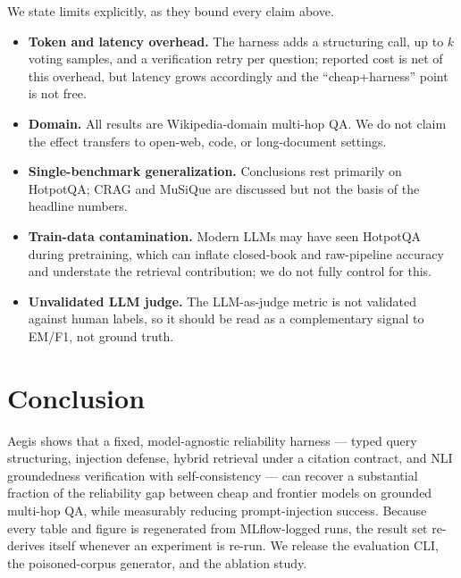 \documentclass[twocolumn,10pt]{article}
\begin{document}
We state limits explicitly, as they bound every claim above.
\begin{itemize}
  \item \textbf{Token and latency overhead.} The harness adds a structuring
  call, up to $k$ voting samples, and a verification retry per question;
  reported cost is net of this overhead, but latency grows accordingly and the
  ``cheap+harness'' point is not free.
  \item \textbf{Domain.} All results are Wikipedia-domain multi-hop QA. We do
  not claim the effect transfers to open-web, code, or long-document settings.
  \item \textbf{Single-benchmark generalization.} Conclusions rest primarily on
  HotpotQA; CRAG and MuSiQue are discussed but not the basis of the headline
  numbers.
  \item \textbf{Train-data contamination.} Modern LLMs may have seen HotpotQA
  during pretraining, which can inflate closed-book and raw-pipeline accuracy
  and understate the retrieval contribution; we do not fully control for this.
  \item \textbf{Unvalidated LLM judge.} The LLM-as-judge metric is not
  validated against human labels, so it should be read as a complementary
  signal to EM/F1, not ground truth.
\end{itemize}

\section{Conclusion}
\label{sec:conclusion}

Aegis shows that a fixed, model-agnostic reliability harness --- typed query
structuring, injection defense, hybrid retrieval under a citation contract,
and NLI groundedness verification with self-consistency --- can recover a
substantial fraction of the reliability gap between cheap and frontier models
on grounded multi-hop QA, while measurably reducing prompt-injection success.
Because every table and figure is regenerated from MLflow-logged runs, the
result set re-derives itself whenever an experiment is re-run. We release the
evaluation CLI, the poisoned-corpus generator, and the ablation study.



\end{document}

